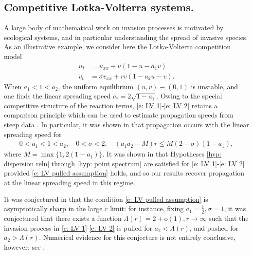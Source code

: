 \documentclass[11pt]{article}
\numberwithin{equation}{section}
\numberwithin{prop}{section}
\begin{document}
\subsection{Competitive Lotka-Volterra systems.} A large body of mathematical work on invasion processes is motivated by ecological systems, and in particular understanding the spread of invasive species. As an illustrative example, we consider here the Lotka-Volterra competition model
\begin{align}
	u_t &= u_{xx} + u (1-u-a_1 v) \label{e: LV 1} \\
	v_t &= \sigma v_{xx} + r v (1-a_2 u -v). \label{e: LV 2}
\end{align}
When $a_1 < 1 < a_2$, the uniform equilibrium $(u, v) \equiv (0, 1)$ is unstable, and one finds the linear spreading speed $c_* = 2 \sqrt{1-a_1}$. Owing to the special competitive structure of the reaction terms, \eqref{e: LV 1}-\eqref{e: LV 2} retains a comparison principle which can be used to estimate propagation speeds from steep data \cite{Alhasanat, LLWCompetitive, LLWCooperative}. In particular, it was shown in \cite{LLWCompetitive} that propagation occurs with the linear spreading speed for 
\begin{align}
0 < a_1 < 1 < a_2, \quad 0 < \sigma < 2, \quad (a_1 a_2 - M) r \leq M (2-\sigma) (1-a_1), \label{e: LV pulled assumption}
\end{align}
where $M = \max \{1, 2(1-a_1)\}$. It was shown in \cite{FayeHolzerLV} that Hypotheses \ref{hyp: dispersion reln} through \ref{hyp: point spectrum} are satisfied for \eqref{e: LV 1}-\eqref{e: LV 2} provided \eqref{e: LV pulled assumption} holds, and so our results recover propagation at the linear spreading speed in this regime. 

It was conjectured in \cite{Hosono} that the condition \eqref{e: LV pulled assumption} is asymptotically sharp in the large $r$ limit: for instance, fixing $a_1 = \frac{1}{2}, \sigma = 1$, it was conjectured that there exists a function $\Lambda(r) = 2 + \mathrm{o}(1), r \to \infty$ such that the invasion process in \eqref{e: LV 1}-\eqref{e: LV 2} is pulled for $a_2 < \Lambda(r)$, and pushed for $a_2 > \Lambda(r)$. Numerical evidence for this conjecture is not entirely conclusive, however; see \cite[Section 6]{AveryHolzerScheel}. 
\end{document}
